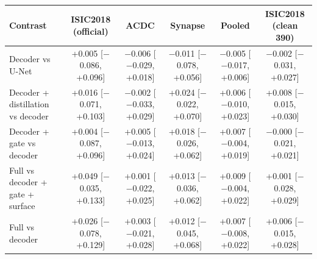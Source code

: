 \begin{tabular}{lccccc}
\toprule
Contrast & ISIC2018 (official) & ACDC & Synapse & Pooled & ISIC2018 (clean 390) \\
\midrule
Decoder vs U-Net & +0.005 [$-$0.086, +0.096] & $-$0.006 [$-$0.029, +0.018] & $-$0.011 [$-$0.078, +0.056] & $-$0.005 [$-$0.017, +0.006] & $-$0.002 [$-$0.031, +0.027] \\
Decoder + distillation vs decoder & +0.016 [$-$0.071, +0.103] & $-$0.002 [$-$0.033, +0.029] & +0.024 [$-$0.022, +0.070] & +0.006 [$-$0.010, +0.023] & +0.008 [$-$0.015, +0.030] \\
Decoder + gate vs decoder & +0.004 [$-$0.087, +0.096] & +0.005 [$-$0.013, +0.024] & +0.018 [$-$0.026, +0.062] & +0.007 [$-$0.004, +0.019] & $-$0.000 [$-$0.021, +0.021] \\
Full vs decoder + gate + surface & +0.049 [$-$0.035, +0.133] & +0.001 [$-$0.022, +0.025] & +0.013 [$-$0.036, +0.062] & +0.009 [$-$0.004, +0.022] & +0.001 [$-$0.028, +0.029] \\
Full vs decoder & +0.026 [$-$0.078, +0.129] & +0.003 [$-$0.021, +0.028] & +0.012 [$-$0.045, +0.068] & +0.007 [$-$0.008, +0.022] & +0.006 [$-$0.015, +0.028] \\
\bottomrule
\end{tabular}
